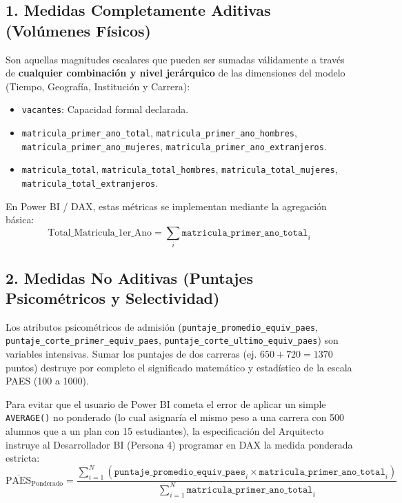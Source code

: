 \documentclass[11pt,a4paper]{article}
\begin{document}
\subsection{1. Medidas Completamente Aditivas (Volúmenes Físicos)}
Son aquellas magnitudes escalares que pueden ser sumadas válidamente a través de \textbf{cualquier combinación y nivel jerárquico} de las dimensiones del modelo (Tiempo, Geografía, Institución y Carrera):
\begin{itemize}[leftmargin=*]
    \item \texttt{vacantes}: Capacidad formal declarada.
    \item \texttt{matricula\_primer\_ano\_total}, \texttt{matricula\_primer\_ano\_hombres}, \texttt{matricula\_primer\_ano\_mujeres}, \texttt{matricula\_primer\_ano\_extranjeros}.
    \item \texttt{matricula\_total}, \texttt{matricula\_total\_hombres}, \texttt{matricula\_total\_mujeres}, \texttt{matricula\_total\_extranjeros}.
\end{itemize}
En Power BI / DAX, estas métricas se implementan mediante la agregación básica:
\begin{equation}
\text{Total\_Matricula\_1er\_Ano} = \sum_{i} \texttt{matricula\_primer\_ano\_total}_i
\end{equation}

\subsection{2. Medidas No Aditivas (Puntajes Psicométricos y Selectividad)}
Los atributos psicométricos de admisión (\texttt{puntaje\_promedio\_equiv\_paes}, \texttt{puntaje\_corte\_primer\_equiv\_paes}, \texttt{puntaje\_corte\_ultimo\_equiv\_paes}) son variables intensivas. Sumar los puntajes de dos carreras (ej. $650 + 720 = 1370$ puntos) destruye por completo el significado matemático y estadístico de la escala PAES (100 a 1000).

Para evitar que el usuario de Power BI cometa el error de aplicar un simple \texttt{AVERAGE()} no ponderado (lo cual asignaría el mismo peso a una carrera con 500 alumnos que a un plan con 15 estudiantes), la especificación del Arquitecto instruye al Desarrollador BI (Persona 4) programar en DAX la medida ponderada estricta:
\begin{equation}
\overline{\text{PAES}}_{\text{Ponderado}} = \frac{\sum_{i=1}^{N} \left( \texttt{puntaje\_promedio\_equiv\_paes}_i \times \texttt{matricula\_primer\_ano\_total}_i \right)}{\sum_{i=1}^{N} \texttt{matricula\_primer\_ano\_total}_i}
\end{equation}
\end{document}
